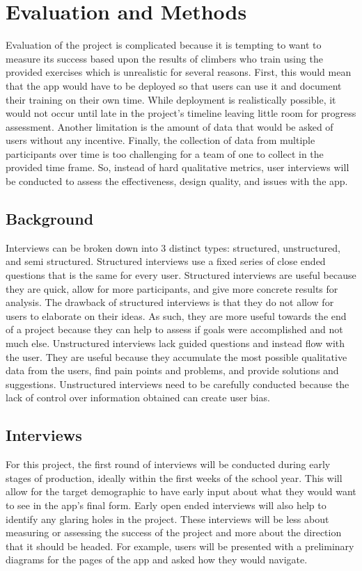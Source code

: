 \documentclass[10pt,twocolumn]{article}
\begin{document}
	
\section{Evaluation and Methods}

	Evaluation of the project is complicated because it is tempting to want to measure its success based upon the results of climbers who train using the provided exercises which is unrealistic for several reasons. First, this would mean that the app would have to be deployed so that users can use it and document their training on their own time. While deployment is realistically possible, it would not occur until late in the project’s timeline leaving little room for progress assessment. Another limitation is the amount of data that would be asked of users without any incentive. Finally, the collection of data from multiple participants over time is too challenging for a team of one to collect in the provided time frame. So, instead of hard qualitative metrics, user interviews will be conducted to assess the effectiveness, design quality, and issues with the app. 

\subsection{Background}

	Interviews can be broken down into 3 distinct types: structured, unstructured, and semi structured. Structured interviews use a fixed series of close ended questions that is the same for every user. Structured interviews are useful because they are quick, allow for more participants, and give more concrete results for analysis. The drawback of structured interviews is that they do not allow for users to elaborate on their ideas. As such, they are more useful towards the end of a project because they can help to assess if goals were accomplished and not much else.  Unstructured interviews lack guided questions and instead flow with the user. They are useful because they accumulate the most possible qualitative data from the users, find pain points and problems, and provide solutions and suggestions. Unstructured interviews need to be carefully conducted because the lack of control over information obtained can create user bias.

\subsection{Interviews}

	For this project, the first round of interviews will be conducted during early stages of production, ideally within the first weeks of the school year. This will allow for the target demographic to have early input about what they would want to see in the app’s final form. Early open ended interviews will also help to identify any glaring holes in the project. These interviews will be less about measuring or assessing the success of the project and more about the direction that it should be headed. For example, users will be presented with a preliminary diagrams for the pages of the app and asked how they would navigate. 
	
\end{document}
